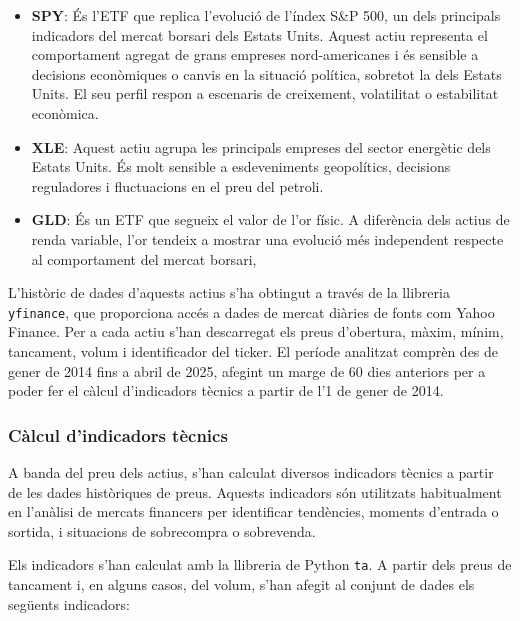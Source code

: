 \documentclass[12pt,a4paper,twoside]{book}
\begin{document}
\begin{itemize}
    \item \textbf{SPY}: És l'ETF que replica l'evolució de l'índex S\&P 500, un dels principals indicadors del mercat borsari dels Estats Units. Aquest actiu representa el comportament agregat de grans empreses nord-americanes i és sensible a decisions econòmiques o canvis en la situació política, sobretot la dels Estats Units. El seu perfil respon a escenaris de creixement, volatilitat o estabilitat econòmica.

    \item \textbf{XLE}: Aquest actiu agrupa les principals empreses del sector energètic dels Estats Units. És molt sensible a esdeveniments geopolítics, decisions reguladores i fluctuacions en el preu del petroli.

    \item \textbf{GLD}: És un ETF que segueix el valor de l'or físic. A diferència dels actius de renda variable, l'or tendeix a mostrar una evolució més independent respecte al comportament del mercat borsari,

\end{itemize}

L'històric de dades d'aquests actius s'ha obtingut a través de la llibreria \texttt{yfinance}, que proporciona accés a dades de mercat diàries de fonts com Yahoo Finance. Per a cada actiu s'han descarregat els preus d'obertura, màxim, mínim, tancament, volum i identificador del ticker. El període analitzat comprèn des de gener de 2014 fins a abril de 2025, afegint un marge de 60 dies anteriors per a poder fer el càlcul d'indicadors tècnics a partir de l'1 de gener de 2014.

\subsubsection*{Càlcul d'indicadors tècnics}

A banda del preu dels actius, s'han calculat diversos indicadors tècnics a partir de les dades històriques de preus. Aquests indicadors són utilitzats habitualment en l'anàlisi de mercats financers per identificar tendències, moments d'entrada o sortida, i situacions de sobrecompra o sobrevenda.

Els indicadors s'han calculat amb la llibreria de Python \texttt{ta}. A partir dels preus de tancament i, en alguns casos, del volum, s'han afegit al conjunt de dades els següents indicadors:
\end{document}
